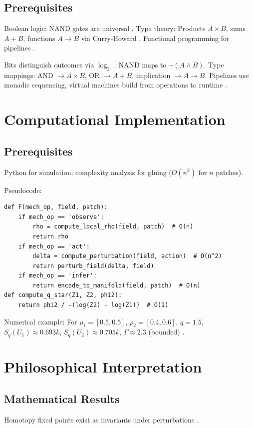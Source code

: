 \documentclass{article}
\begin{document}
\subsection{Prerequisites}
Boolean logic: NAND gates are universal \cite{Girard1987}. Type theory: Products $A \times B$, sums $A + B$, functions $A \to B$ via Curry-Howard \cite{Coquand1988}. Functional programming for pipelines \cite{Wadler1992}.

Bits distinguish outcomes via $\log_2$ \cite{Nielsen2010}. NAND maps to $\neg (A \wedge B)$. Type mappings: AND $\to A \times B$, OR $\to A + B$, implication $\to A \to B$. Pipelines use monadic sequencing, virtual machines build from operations to runtime \cite{Wadler1992}.

\section{Computational Implementation}

\subsection{Prerequisites}
Python for simulation; complexity analysis for gluing ($O(n^2)$ for $n$ patches).

Pseudocode:
\lstset{language=Python}
\begin{lstlisting}
def F(mech_op, field, patch):
    if mech_op == 'observe':
        rho = compute_local_rho(field, patch)  # O(n)
        return rho
    if mech_op == 'act':
        delta = compute_perturbation(field, action)  # O(n^2)
        return perturb_field(delta, field)
    if mech_op == 'infer':
        return encode_to_manifold(field, patch)  # O(n)
def compute_q_star(Z1, Z2, phi2):
    return phi2 / -(log(Z2) - log(Z1))  # O(1)
\end{lstlisting}

Numerical example: For $\rho_1 = [0.5, 0.5]$, $\rho_2 = [0.4, 0.6]$, $q=1.5$, $S_q(U_1) \approx 0.693k$, $S_q(U_2) \approx 0.705k$, $\Gamma \approx 2.3$ (bounded) \cite{Soares2024}.

\section{Philosophical Interpretation}

\subsection{Mathematical Results}
Homotopy fixed points exist as invariants under perturbations \cite{Awodey2010}.
\end{document}
